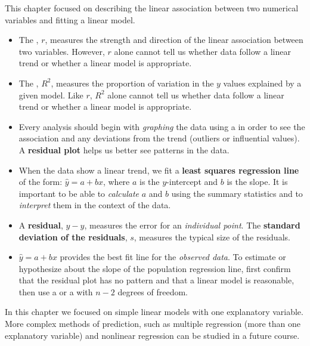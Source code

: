 \noindent This chapter focused on describing the linear association between two numerical variables and fitting a linear model.  
\begin{itemize}
\item The , $r$, measures the strength and direction of the linear association between two variables.  However, $r$ alone cannot tell us whether data follow a linear trend or whether a linear model is appropriate.

\item The , $R^2$, measures the proportion of variation in the $y$ values explained by a given model.  Like $r$, $R^2$ alone cannot tell us whether data follow a linear trend or whether a linear model is appropriate.  

\item Every analysis should begin with \emph{graphing} the data using a  in order to see the association and any deviations from the trend (outliers or influential values).  A \textbf{residual plot} helps us better see patterns in the data.  

\item When the data show a linear trend, we fit a \textbf{least squares regression line} of the form: $\hat{y} = a+bx$, where $a$ is the $y$-intercept and $b$ is the slope.  It is important to be able to \emph{calculate} $a$ and $b$ using the summary statistics and to \emph{interpret} them in the context of the data.

\item A \textbf{residual}, $y-\hat{y}$, measures the error for an \emph{individual point}.  The \textbf{standard deviation of the residuals}, $s$, measures the typical size of the residuals.  

\item $\hat{y} = a+bx$ provides the best fit line for the \emph{observed data}.  To estimate or hypothesize about the slope of the population regression line, first confirm that the residual plot has no pattern and that a linear model is reasonable, then use a  or a  with $n-2$ degrees of freedom.
\end{itemize}
In this chapter we focused on simple linear models with one explanatory variable.  More complex methods of prediction, such as multiple regression (more than one explanatory variable) and nonlinear regression can be studied in a future course.


